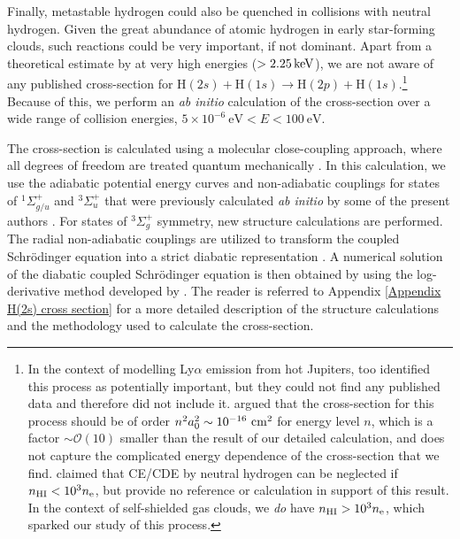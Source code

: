 \documentclass[fleqn,usenatbib]{mnras}
\begin{document}
Finally, metastable hydrogen could also be quenched in collisions with neutral hydrogen. Given the great abundance of atomic hydrogen in early star-forming clouds, such reactions could be very important, if not dominant. Apart from a theoretical estimate by \cite{Flannery1971} at very high energies ($> 2.25\,\rm keV$), we are not aware of any published cross-section for $\textrm{H}(2s)+\textrm{H}(1s) \rightarrow \textrm{H}(2p)+\textrm{H}(1s)$.\footnote{In the context of modelling Ly$\alpha$ emission from hot Jupiters, \cite{Menager2013} too identified this process as potentially important, but they could not find any published data and therefore did not include it. \cite{Laursen2010} argued that the cross-section for this process should be of order $n^2 a_0^2 \sim 10^{-16} ~ \rm cm^2$ for energy level $n$, which is a factor $\sim \mathcal{O}(10)$ smaller than the result of our detailed calculation, and does not capture the complicated energy dependence of the cross-section that we find. \cite{Spitzer1951} claimed that CE/CDE by neutral hydrogen can be neglected if $n_{\rm HI} < 10^3 n_{\rm e}$, but provide no reference or calculation in support of this result. In the context of self-shielded gas clouds, we \textit{do} have $n_{\rm HI} > 10^3 n_{\rm e}$, which sparked our study of this process.} Because of this, we perform an \textit{ab initio} calculation of the cross-section over a wide range of collision energies, $5 \times 10^{-6} ~ \textrm{eV} < E < 100 ~ \textrm{eV}$. 

The cross-section is calculated using a molecular close-coupling approach, where all degrees of freedom are treated quantum mechanically \citep[][]{stenrup2009}. In this calculation, we use the adiabatic potential energy curves and non-adiabatic couplings for states of $^1\Sigma^+_{g/u}$ and $^3\Sigma^+_{u}$ that were previously calculated \textit{ab initio} by some of the present authors \citep[][]{hornquist2022,hornquist2023}. For states of $^3\Sigma^+_g$ symmetry, new structure calculations are performed. The radial non-adiabatic couplings are utilized to transform the coupled Schrödinger equation into a strict diabatic representation \citep[][]{mead1982}. A numerical solution of the diabatic coupled Schrödinger equation is then obtained by using the log-derivative method developed by \cite{johnson1973}. The reader is referred to Appendix \ref{Appendix H(2s) cross section} for a more detailed description of the structure calculations and the methodology used to calculate the cross-section.
\end{document}

